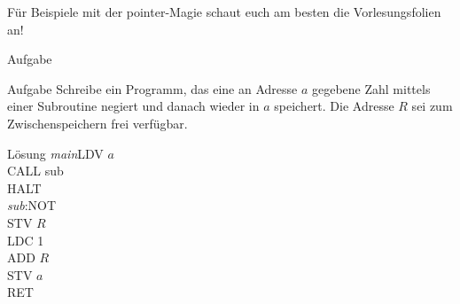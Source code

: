 \begin{frame}
	Für Beispiele mit der pointer-Magie schaut euch am besten die Vorlesungsfolien an!
\end{frame}

\begin{frame}{Aufgabe}
	\begin{exampleblock}{Aufgabe}
		Schreibe ein Programm, das eine an Adresse $a$ gegebene Zahl mittels einer Subroutine negiert und danach wieder in $a$ speichert. Die Adresse $R$ sei zum Zwischenspeichern frei verfügbar.
	\end{exampleblock}
\end{frame}

\begin{frame}
	\begin{block}{Lösung}
		\emph{main}LDV $a$\\
		CALL sub\\	
		HALT\\
		\emph{sub}:NOT\\
		STV $R$\\
		LDC 1\\
		ADD $R$\\
		STV $a$\\
		RET
	\end{block}
\end{frame}
